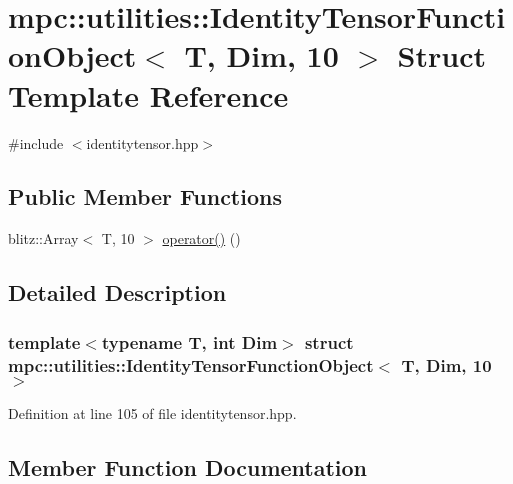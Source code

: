 \hypertarget{structmpc_1_1utilities_1_1_identity_tensor_function_object_3_01_t_00_01_dim_00_0110_01_4}{}\section{mpc\+:\+:utilities\+:\+:Identity\+Tensor\+Function\+Object$<$ T, Dim, 10 $>$ Struct Template Reference}
\label{structmpc_1_1utilities_1_1_identity_tensor_function_object_3_01_t_00_01_dim_00_0110_01_4}


{\ttfamily \#include $<$identitytensor.\+hpp$>$}

\subsection*{Public Member Functions}
\begin{DoxyCompactItemize}
\item 
blitz\+::\+Array$<$ T, 10 $>$ \mbox{\hyperlink{structmpc_1_1utilities_1_1_identity_tensor_function_object_3_01_t_00_01_dim_00_0110_01_4_acfb99c78c797a5675e8b418db589a7a1}{operator()}} ()
\end{DoxyCompactItemize}


\subsection{Detailed Description}
\subsubsection*{template$<$typename T, int Dim$>$\newline
struct mpc\+::utilities\+::\+Identity\+Tensor\+Function\+Object$<$ T, Dim, 10 $>$}



Definition at line 105 of file identitytensor.\+hpp.



\subsection{Member Function Documentation}
\mbox{\label{structmpc_1_1utilities_1_1_identity_tensor_function_object_3_01_t_00_01_dim_00_0110_01_4_acfb99c78c797a5675e8b418db589a7a1}} 
